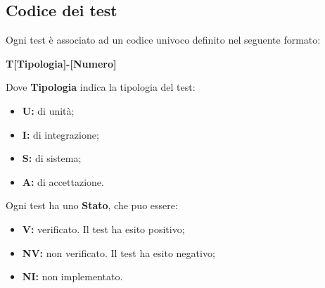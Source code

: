 \documentclass[8pt]{article}
\begin{document}
\subsection{Codice dei test}
Ogni test è associato ad un codice univoco definito nel seguente formato:
\begin{center}
	\textbf{T[Tipologia]-[Numero]}
\end{center}
Dove \textbf{Tipologia} indica la tipologia del test: 
\begin{itemize}
    \item \textbf{U:} di unit\`{a};
	\item \textbf{I:} di integrazione;
	\item \textbf{S:} di sistema;
	\item \textbf{A:} di accettazione.
\end{itemize}
Ogni test ha uno \textbf{Stato}, che puo essere:
\begin{itemize}
	\item \textbf{V:} verificato. Il test ha esito positivo;
	\item \textbf{NV:} non verificato. Il test ha esito negativo; 
	\item \textbf{NI:} non implementato.
\end{itemize}
\clearpage
\end{document}
